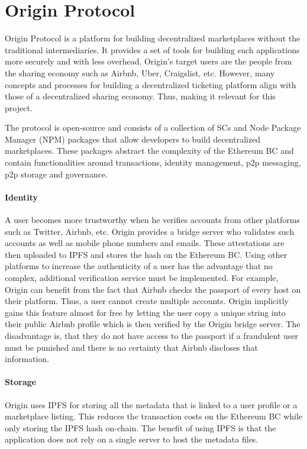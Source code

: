 
\section{Origin Protocol}
Origin Protocol \cite{origin-protocol-whitepaper} is a platform for building decentralized marketplaces without the traditional intermediaries. It provides a set of tools for building such applications more securely and with less overhead. Origin's target users are the people from the sharing economy such as Airbnb, Uber, Craigslist, etc. However, many concepts and processes for building a decentralized ticketing platform align with those of a decentralized sharing economy. Thus, making it relevant for this project.

The protocol is open-source and consists of a collection of SCs and Node Package Manager (NPM) packages that allow developers to build decentralized marketplaces. These packages abstract the complexity of the Ethereum BC and contain functionalities around transactions, identity management, p2p messaging, p2p storage and governance.


\paragraph{Identity}
A user becomes more trustworthy when he verifies accounts from other platforms such as Twitter, Airbnb, etc. Origin provides a bridge server who validates such accounts as well as mobile phone numbers and emails. These attestations are then uploaded to IPFS and stores the hash on the Ethereum BC. 
Using other platforms to increase the authenticity of a user has the advantage that no complex, additional verification service must be implemented. 
For example, Origin can benefit from the fact that Airbnb checks the passport of every host on their platform. Thus, a user cannot create multiple accounts. Origin implicitly gains this feature almost for free by letting the user copy a unique string into their public Airbnb profile which is then verified by the Origin bridge server.
The disadvantage is, that they do not have access to the passport if a fraudulent user must be punished and there is no certainty that Airbnb discloses that information.


\paragraph{Storage}
Origin uses IPFS for storing all the metadata that is linked to a user profile or a marketplace listing. This reduces the transaction costs on the Ethereum BC while only storing the IPFS hash on-chain. The benefit of using IPFS is that the application does not rely on a single server to host the metadata files. 

